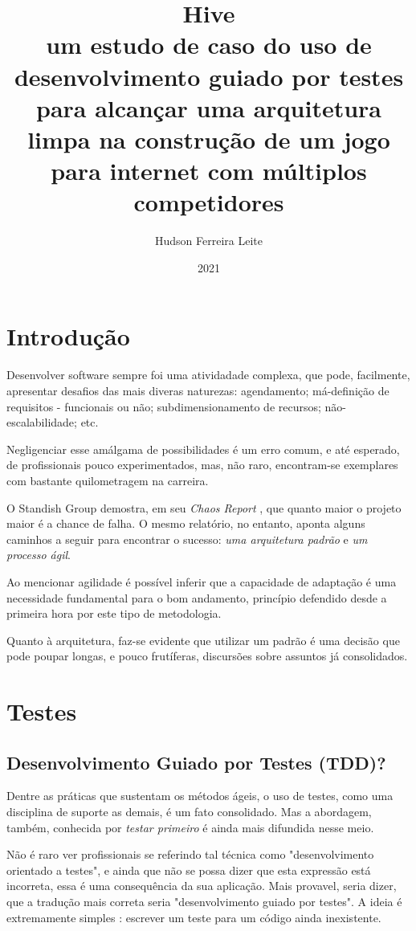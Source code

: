\documentclass[12pt,a4paper,oneside,english,brazil]{article}
\title{
  \textbf{Hive} \\
  \large um estudo de caso do uso de desenvolvimento guiado por testes para
  alcançar uma arquitetura limpa na construção de um jogo para internet com
  múltiplos competidores
}
\author{Hudson Ferreira Leite}
\date{2021}
\begin{document}

\clearpage

\section{Introdução}

Desenvolver software sempre foi uma atividadade complexa, que pode, facilmente,
apresentar desafios das mais diveras naturezas: agendamento; má-definição de
requisitos - funcionais ou não; subdimensionamento de recursos;
não-escalabilidade; etc.

Negligenciar esse amálgama de possibilidades é um erro comum, e até esperado,
de profissionais pouco experimentados, mas, não raro, encontram-se exemplares
com bastante quilometragem na carreira.

O Standish Group demostra, em seu \emph{Chaos Report} \cite{ChaosReport2015}, que
quanto maior o projeto maior é a chance de falha. O mesmo relatório, no entanto,
aponta alguns caminhos a seguir para encontrar o sucesso: \emph{uma
arquitetura padrão} e \emph{um processo ágil}.

Ao mencionar agilidade é possível inferir que a capacidade de adaptação é uma
necessidade fundamental para o bom andamento, princípio defendido desde a
primeira hora por este tipo de metodologia.

Quanto à  arquitetura, faz-se evidente que utilizar um padrão é uma decisão que
pode poupar longas, e pouco frutíferas, discursões sobre assuntos já
consolidados.

\section{Testes}

\subsection{Desenvolvimento Guiado por Testes (TDD)?}

Dentre as práticas que sustentam os métodos ágeis, o uso de testes, como uma
disciplina de suporte as demais, é um fato consolidado. Mas a abordagem, também,
conhecida por \emph{testar primeiro} é ainda mais difundida nesse meio.

Não é raro ver profissionais se referindo tal técnica como "desenvolvimento
orientado a testes", e ainda que não se possa dizer que esta expressão está
incorreta, essa é uma consequência da sua aplicação. Mais provavel, seria dizer,
que a tradução mais correta seria "desenvolvimento guiado por testes". A ideia é
extremamente simples \cite[p.1]{FreemanPryce2009}: escrever um teste para um
código ainda inexistente.
\end{document}
